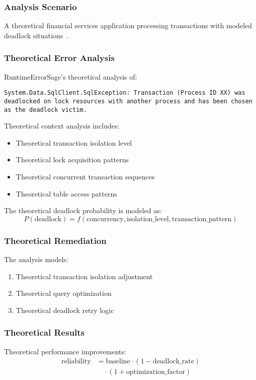 \subsubsection{Analysis Scenario}
A theoretical financial services application processing transactions with modeled deadlock situations~\cite{transaction_management_2024}.

\subsubsection{Theoretical Error Analysis}
RuntimeErrorSage's theoretical analysis of:
\begin{lstlisting}[style=csharpstyle,caption={Theoretical Database Deadlock Error}]
System.Data.SqlClient.SqlException: Transaction (Process ID XX) was deadlocked on lock resources with another process and has been chosen as the deadlock victim.
\end{lstlisting}

Theoretical context analysis includes:
\begin{itemize}
    \item Theoretical transaction isolation level
    \item Theoretical lock acquisition patterns
    \item Theoretical concurrent transaction sequences
    \item Theoretical table access patterns
\end{itemize}

The theoretical deadlock probability is modeled as:
\begin{equation}
P(\text{deadlock}) = f(\text{concurrency}, \text{isolation\_level}, \text{transaction\_pattern})
\end{equation}

\subsubsection{Theoretical Remediation}
The analysis models:
\begin{enumerate}
    \item Theoretical transaction isolation adjustment
    \item Theoretical query optimization
    \item Theoretical deadlock retry logic
\end{enumerate}

\subsubsection{Theoretical Results}
Theoretical performance improvements:
\begin{equation}
\begin{split}
\text{reliability} &= \text{baseline} \cdot (1 - \text{deadlock\_rate}) \\
&\quad \cdot (1 + \text{optimization\_factor})
\end{split}
\end{equation}

